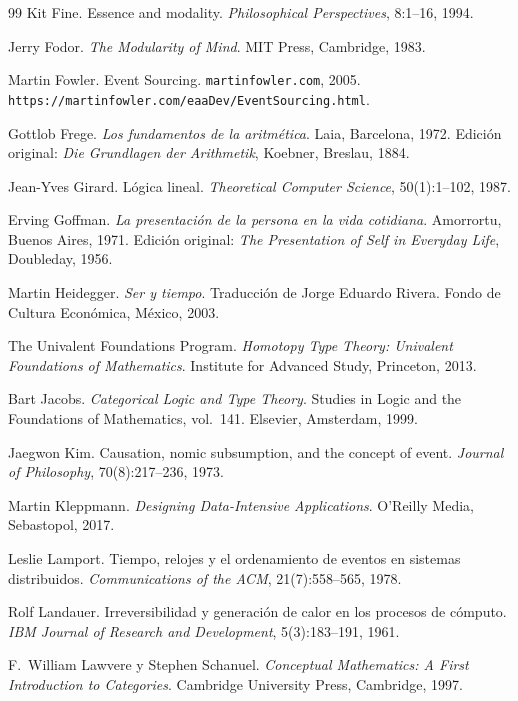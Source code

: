 \documentclass[12pt]{article}
\theoremstyle{plain}
\theoremstyle{definition}
\begin{document}
\begin{thebibliography}{99}
Kit Fine.
Essence and modality.
\textit{Philosophical Perspectives}, 8:1--16, 1994.

Jerry Fodor.
\textit{The Modularity of Mind}.
MIT Press, Cambridge, 1983.

Martin Fowler.
Event Sourcing.
\texttt{martinfowler.com}, 2005.
\texttt{https://martinfowler.com/eaaDev/EventSourcing.html}.

Gottlob Frege.
\textit{Los fundamentos de la aritmética}.
Laia, Barcelona, 1972.
Edición original: \textit{Die Grundlagen der Arithmetik}, Koebner, Breslau, 1884.

Jean-Yves Girard.
Lógica lineal.
\textit{Theoretical Computer Science}, 50(1):1--102, 1987.

Erving Goffman.
\textit{La presentación de la persona en la vida cotidiana}.
Amorrortu, Buenos Aires, 1971.
Edición original: \textit{The Presentation of Self in Everyday Life}, Doubleday, 1956.

Martin Heidegger.
\textit{Ser y tiempo}.
Traducción de Jorge Eduardo Rivera.
Fondo de Cultura Económica, México, 2003.

The Univalent Foundations Program.
\textit{Homotopy Type Theory: Univalent Foundations of Mathematics}.
Institute for Advanced Study, Princeton, 2013.

Bart Jacobs.
\textit{Categorical Logic and Type Theory}.
Studies in Logic and the Foundations of Mathematics, vol.~141.
Elsevier, Amsterdam, 1999.

Jaegwon Kim.
Causation, nomic subsumption, and the concept of event.
\textit{Journal of Philosophy}, 70(8):217--236, 1973.

Martin Kleppmann.
\textit{Designing Data-Intensive Applications}.
O'Reilly Media, Sebastopol, 2017.

Leslie Lamport.
Tiempo, relojes y el ordenamiento de eventos en sistemas distribuidos.
\textit{Communications of the ACM}, 21(7):558--565, 1978.

Rolf Landauer.
Irreversibilidad y generación de calor en los procesos de cómputo.
\textit{IBM Journal of Research and Development}, 5(3):183--191, 1961.

F.~William Lawvere y Stephen Schanuel.
\textit{Conceptual Mathematics: A First Introduction to Categories}.
Cambridge University Press, Cambridge, 1997.


\end{thebibliography}
\end{document}
